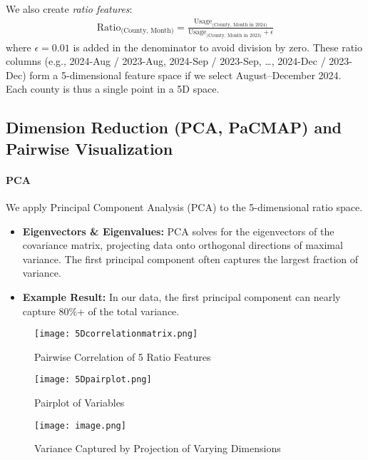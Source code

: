 \documentclass[12pt]{article}
\begin{document}
We also create \emph{ratio features}:
\begin{align}
    \text{Ratio}_{\text{(County, Month)}} = 
    \frac{\text{Usage}_{\text{(County, Month in 2024)}}}
         {\text{Usage}_{\text{(County, Month in 2023)}} + \epsilon} 
\end{align}
where $\epsilon = 0.01$ is added in the denominator to avoid division by zero. These ratio columns (e.g., 2024-Aug / 2023-Aug, 2024-Sep / 2023-Sep, \ldots, 2024-Dec / 2023-Dec) form a 5-dimensional feature space if we select August--December 2024. Each county is thus a single point in a 5D space.

\subsection{Dimension Reduction (PCA, PaCMAP) and Pairwise Visualization}
\label{subsec:dimred}
\paragraph{PCA \cite{PCAReference}}
We apply Principal Component Analysis (PCA) to the 5-dimensional ratio space. 
\begin{itemize}
    \item \textbf{Eigenvectors \& Eigenvalues:} PCA solves for the eigenvectors of the covariance matrix, projecting data onto orthogonal directions of maximal variance. The first principal component often captures the largest fraction of variance. 
    \item \textbf{Example Result:} In our data, the first principal component can nearly capture 80\%+ of the total variance.
\end{itemize}

\begin{figure}[H]
    \centering
    \texttt{[image: 5Dcorrelationmatrix.png]}
    \caption{Pairwise Correlation of 5 Ratio Features}
    \label{fig:enter-label}
\end{figure}

\begin{figure}[H]
    \centering
    \texttt{[image: 5Dpairplot.png]}
    \caption{Pairplot of Variables}
    \label{fig:enter-label}
\end{figure}

\begin{figure}[H]
    \centering
    \texttt{[image: image.png]}
    \caption{Variance Captured by Projection of Varying Dimensions}
    \label{fig:enter-label}
\end{figure}
\end{document}
